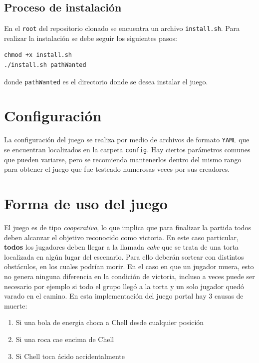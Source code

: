 \documentclass[a4paper]{article}
\begin{document}
\subsection{Proceso de instalación}

En el \texttt{root} del repositorio clonado se encuentra un archivo \texttt{install.sh}. Para realizar la instalación se debe seguir los siguientes pasos:

\begin{verbatim}
chmod +x install.sh
./install.sh pathWanted
\end{verbatim}
donde \texttt{pathWanted} es el directorio donde se desea instalar el juego.

\section{Configuración}

La configuración del juego se realiza por medio de archivos de formato \texttt{YAML} que se encuentran localizados en la carpeta \texttt{config}. Hay ciertos parámetros comunes que pueden variarse, pero se recomienda mantenerlos dentro del mismo rango para obtener el juego que fue testeado numerosas veces por sus creadores.

\section{Forma de uso del juego}
El juego es de tipo \textit{cooperativo}, lo que implica que para finalizar la partida todos deben alcanzar el objetivo reconocido como victoria. En este caso particular, \textbf{todos} los jugadores deben llegar a la llamada \textit{cake} que se trata de una torta localizada en algún lugar del escenario. Para ello deberán sortear con distintos obstáculos, en los cuales podrían morir. En el caso en que un jugador muera, esto no genera ninguna diferencia en la condición de victoria, incluso a veces puede ser necesario por ejemplo si todo el grupo llegó a la torta y un solo jugador quedó varado en el camino. En esta implementación del juego portal hay 3 causas de muerte:
\begin{enumerate}
	\item Si una bola de energia choca a Chell desde cualquier posición
	\item Si una roca cae encima de Chell
	\item Si Chell toca ácido accidentalmente
\end{enumerate}
\end{document}
